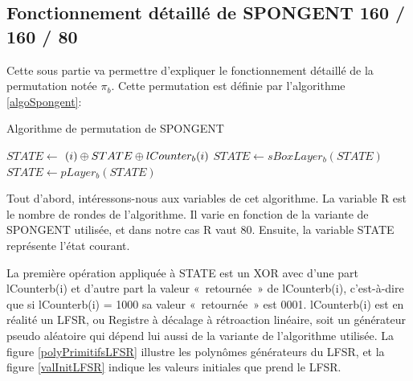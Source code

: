 		\subsection{Fonctionnement détaillé de SPONGENT 160 / 160 / 80}

				Cette sous partie va permettre d'expliquer le fonctionnement détaillé de la
			permutation notée $\pi_{b}$. Cette permutation est définie par l'algorithme
			\ref{algoSpongent}:

			\begin{algorithm}
				\caption{Algorithme de permutation de SPONGENT}
				\label{algoSpongent}
				\begin{algorithmic}
						\STATE $ STATE \leftarrow $ $(i) \mathbin{\oplus} STATE \mathbin{\oplus} lCounter_{b}(i)$
						\STATE $ STATE \leftarrow sBoxLayer_{b}(STATE)$
						\STATE $ STATE \leftarrow pLayer_{b}(STATE)$
					\ENDFOR
				\end{algorithmic}
			\end{algorithm}

				Tout d'abord, intéressons-nous aux variables de cet algorithme. La
			variable R est le nombre de rondes de l'algorithme. Il varie en fonction
			de la variante de SPONGENT utilisée, et dans notre cas R vaut 80. Ensuite,
			la variable STATE représente l'état courant.

				La première opération appliquée à STATE est un XOR avec d'une part
			lCounterb(i) et d'autre part la valeur « retournée » de lCounterb(i),
			c'est-à-dire que si lCounterb(i) = 1000 sa valeur « retournée » est 0001.
			lCounterb(i) est en réalité un LFSR, ou Registre à décalage à rétroaction
			linéaire, soit un générateur pseudo aléatoire qui dépend lui aussi de la
			variante de l'algorithme utilisée. La figure \ref{polyPrimitifsLFSR}
			illustre les polynômes générateurs du LFSR, et la figure \ref{valInitLFSR}
			indique les valeurs initiales que prend le LFSR.

